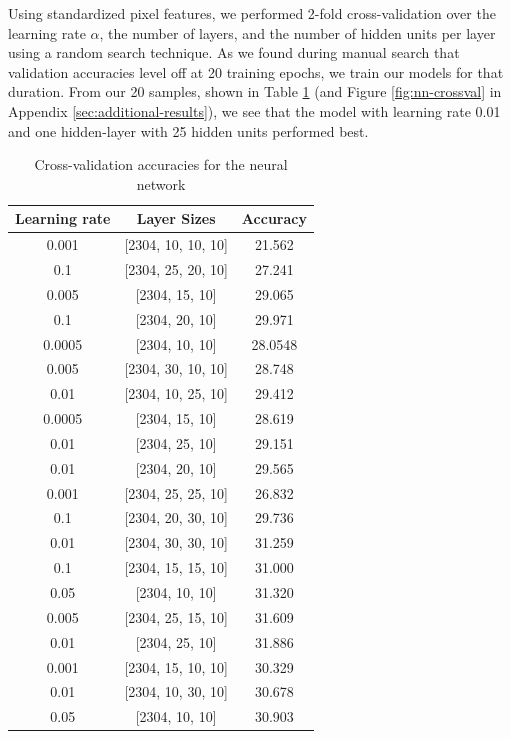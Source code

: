 \documentclass{acm_proc_article-sp}
\begin{document}
Using standardized pixel features, we performed 2-fold cross-validation over the learning rate $\alpha$, the number of layers, and the number of hidden units per layer using a random search technique. As we found during manual search that validation accuracies level off at 20 training epochs, we train our models for that duration. From our 20 samples, shown in Table \ref{tab:nn-crossval} (and Figure \ref{fig:nn-crossval} in Appendix \ref{sec:additional-results}), we see that the model with learning rate 0.01 and one hidden-layer with 25 hidden units performed best.

\begin{table}[h!]
  \centering
  \begin{tabular}{|c|c|c|}
  \hline
  {\bfseries Learning rate} & {\bfseries Layer Sizes} & {\bfseries Accuracy}\\
  \hline \hline
  0.001  & [2304, 10, 10, 10] & 21.562   \\
     0.1  & [2304, 25, 20, 10] &  27.241   \\
     0.005 & [2304, 15, 10] &      29.065  \\
     0.1   &[2304, 20, 10] & 29.971   \\
     0.0005 & [2304, 10, 10] & 28.0548   \\
     0.005  &  [2304, 30, 10, 10] &  28.748 \\
     0.01  & [2304, 10, 25, 10] &  29.412 \\
     0.0005 & [2304, 15, 10] &  28.619     \\
     0.01 & [2304, 25, 10] &   29.151  \\
     0.01 & [2304, 20, 10] &  29.565 \\
     0.001  &  [2304, 25, 25, 10] & 26.832  \\
     0.1  & [2304, 20, 30, 10] &  29.736 \\
     0.01 &  [2304, 30, 30, 10] &  31.259   \\
     0.1  & [2304, 15, 15, 10] &  31.000    \\
     0.05  &  [2304, 10, 10] & 31.320    \\
     0.005  &  [2304, 25, 15, 10] & 31.609  \\
     0.01 & [2304, 25, 10] & 31.886  \\
     0.001 &  [2304, 15, 10, 10] &       30.329 \\
     0.01  &  [2304, 10, 30, 10] & 30.678   \\
     0.05 &  [2304, 10, 10] &     30.903 \\
     \hline
  \end{tabular}
  \caption{Cross-validation accuracies for the neural network}
  \label{tab:nn-crossval}
\end{table}
\end{document}
